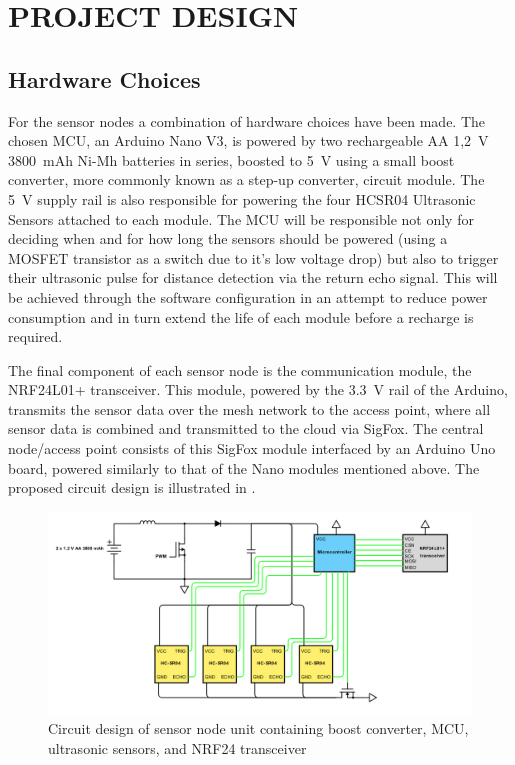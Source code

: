 \documentclass[10pt,twocolumn]{witseiepaper}
\begin{document}
\section{PROJECT DESIGN}
	\subsection{Hardware Choices} \label{hardware_choices}
	
		For the sensor nodes a combination of hardware choices have been made. The chosen MCU, an Arduino Nano V3, is powered by two rechargeable AA 1,2~V 3800~mAh Ni-Mh batteries in series, boosted to 5~V using a small boost converter, more commonly known as a step-up converter, circuit module. The 5~V supply rail is also responsible for powering the four HCSR04 Ultrasonic Sensors attached to each module. The MCU will be responsible not only for deciding when and for how long the sensors should be powered (using a MOSFET transistor as a switch due to it's low voltage drop) but also to trigger their ultrasonic pulse for distance detection via the return echo signal. This will be achieved through the software configuration in an attempt to reduce power consumption and in turn extend the life of each module before a recharge is required. 
		
		The final component of each sensor node is the communication module, the NRF24L01+ transceiver. This module, powered by the 3.3~V rail of the Arduino, transmits the sensor data over the mesh network to the access point, where all sensor data is combined and transmitted to the cloud via SigFox. The central node/access point consists of this SigFox module interfaced by an Arduino Uno board, powered similarly to that of the Nano modules mentioned above. The proposed circuit design is illustrated in .

		\begin{figure}[h]
			\centering
			\includegraphics[width=\textwidth]{media/node-circuit.png}
			\caption{Circuit design of sensor node unit containing boost converter, MCU, ultrasonic sensors, and NRF24 transceiver}
			\raggedright
			\label{fig:node-circuit}
		\end{figure}
	
\end{document}

